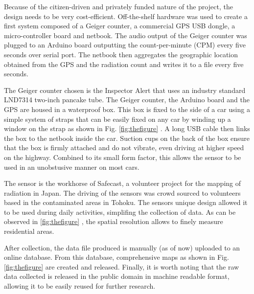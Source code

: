 \documentclass[11pt]{article}
\begin{document}
Because of the citizen-driven and privately funded nature of the project, the
design needs to be very cost-efficient. Off-the-shelf hardware was used to
create a first system composed of a Geiger counter, a commercial GPS USB
dongle, a micro-controller board and netbook. The audio output of the Geiger
counter was plugged to an Arduino board outputting the count-per-minute (CPM)
every five seconds over serial port. The netbook then aggregates the geographic
location obtained from the GPS and the radiation count and writes it to a file
every five seconds.

The Geiger counter chosen is the Inspector Alert \cite{inspector} that uses an
industry standard \cite{radiological} LND7314 two-inch pancake tube. The Geiger
counter, the Arduino board and the GPS are housed in a waterproof box. This box
is fixed to the side of a car using a simple system of straps that can be
easily fixed on any car by winding up a window on the strap as shown in Fig.
\ref{fig:thefigure} . A long USB cable then links the box
to the netbook inside the car. Suction cups on the back of the box ensure that
the box is firmly attached and do not vibrate, even driving at higher speed on
the highway. Combined to its small form factor, this allows the sensor to be
used in an unobstusive manner on most cars.

The sensor is the workhorse of Safecast\cite{safecast}, a volunteer project
for the mapping of radiation in Japan. The driving of the sensors was crowd
sourced to volunteers based in the contaminated areas in Tohoku. The sensors
unique design allowed it to be used during daily activities, simplifing the
collection of data. As can be observed in \ref{fig:thefigure}
, the spatial resolution allows to finely measure
residential areas.

After collection, the data file produced is manually (as of now) uploaded to an
online database. From this database, comprehensive maps as shown in Fig.
\ref{fig:thefigure}  are created and released. Finally, it
is worth noting that the raw data collected is released in the public domain in
machine readable format, allowing it to be easily reused for further research.
\end{document}
